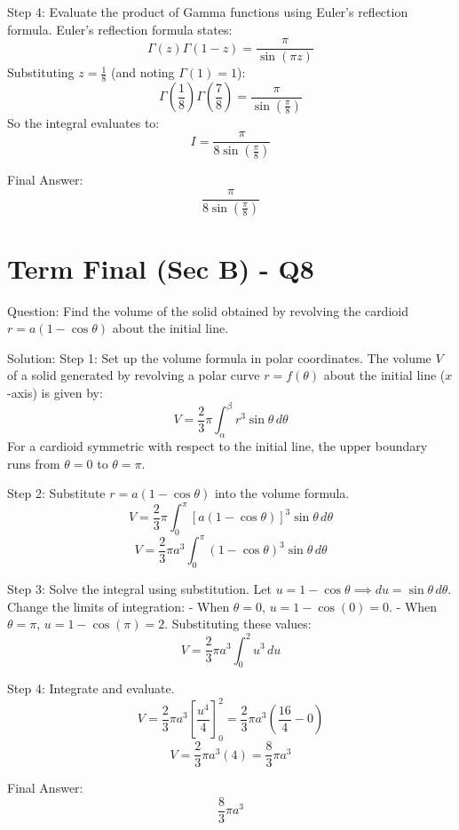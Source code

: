 \documentclass{article}
\begin{document}
Step 4: Evaluate the product of Gamma functions using Euler's reflection formula.
Euler's reflection formula states:
\[
\Gamma(z) \Gamma(1-z) = \frac{\pi}{\sin(\pi z)}
\]
Substituting $z = \frac{1}{8}$ (and noting $\Gamma(1) = 1$):
\[
\Gamma\left(\frac{1}{8}\right) \Gamma\left(\frac{7}{8}\right) = \frac{\pi}{\sin\left(\frac{\pi}{8}\right)}
\]
So the integral evaluates to:
\[
I = \frac{\pi}{8 \sin\left(\frac{\pi}{8}\right)}
\]

Final Answer:
\[
\boxed{\frac{\pi}{8 \sin\left(\frac{\pi}{8}\right)}}
\]

\section*{Term Final (Sec B) - Q8}
Question:
Find the volume of the solid obtained by revolving the cardioid $r = a(1 - \cos \theta)$ about the initial line.

Solution:
Step 1: Set up the volume formula in polar coordinates.
The volume $V$ of a solid generated by revolving a polar curve $r = f(\theta)$ about the initial line ($x$-axis) is given by:
\[
V = \frac{2}{3} \pi \int_{\alpha}^{\beta} r^3 \sin \theta \, d\theta
\]
For a cardioid symmetric with respect to the initial line, the upper boundary runs from $\theta = 0$ to $\theta = \pi$.

Step 2: Substitute $r = a(1 - \cos \theta)$ into the volume formula.
\[
V = \frac{2}{3} \pi \int_0^\pi \left[ a(1 - \cos \theta) \right]^3 \sin \theta \, d\theta
\]
\[
V = \frac{2}{3} \pi a^3 \int_0^\pi (1 - \cos \theta)^3 \sin \theta \, d\theta
\]

Step 3: Solve the integral using substitution.
Let $u = 1 - \cos \theta \implies du = \sin \theta \, d\theta$.
Change the limits of integration:
- When $\theta = 0$, $u = 1 - \cos(0) = 0$.
- When $\theta = \pi$, $u = 1 - \cos(\pi) = 2$.
Substituting these values:
\[
V = \frac{2}{3} \pi a^3 \int_0^2 u^3 \, du
\]

Step 4: Integrate and evaluate.
\[
V = \frac{2}{3} \pi a^3 \left[ \frac{u^4}{4} \right]_0^2 = \frac{2}{3} \pi a^3 \left( \frac{16}{4} - 0 \right)
\]
\[
V = \frac{2}{3} \pi a^3 (4) = \frac{8}{3} \pi a^3
\]

Final Answer:
\[
\boxed{\frac{8}{3} \pi a^3}
\]
\end{document}

